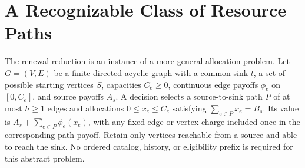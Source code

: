 \section{A Recognizable Class of Resource Paths}\label{sec:class59}
The renewal reduction is an instance of a more general allocation problem. Let $G=(V,E)$ be a finite directed acyclic graph with a common sink $t$, a set of possible starting vertices $S$, capacities $C_e\geq0$, continuous edge payoffs $\phi_e$ on $[0,C_e]$, and source payoffs $A_s$. A decision selects a source-to-sink path $P$ of at most $h\geq1$ edges and allocations $0\leq x_e\leq C_e$ satisfying $\sum_{e\in P}x_e=B_s$. Its value is $A_s+\sum_{e\in P}\phi_e(x_e)$, with any fixed edge or vertex charge included once in the corresponding path payoff. Retain only vertices reachable from a source and able to reach the sink. No ordered catalog, history, or eligibility prefix is required for this abstract problem.

